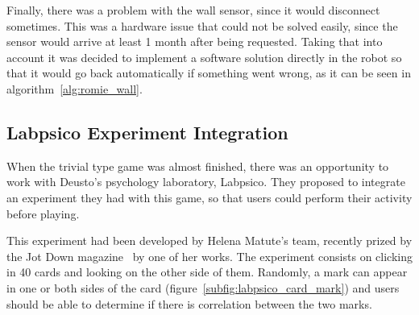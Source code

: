 Finally, there was a problem with the wall sensor, since it would disconnect sometimes. This was a
hardware issue that could not be solved easily, since the sensor would arrive at least 1 month after
being requested. Taking that into account it was decided to implement a software solution directly
in the robot so that it would go back automatically if something went wrong, as it can be seen in
algorithm~\ref{alg:romie_wall}.

\subsection{Labpsico Experiment Integration}

When the trivial type game was almost finished, there was an opportunity to work with Deusto's
psychology laboratory, Labpsico. They proposed to integrate an experiment they had with this game,
so that users could perform their activity before playing.

This experiment had been developed by Helena Matute's team, recently prized by the Jot Down
magazine~\cite{jotdown_helena} by one of her works. The experiment consists on clicking in 40 cards
and looking on the other side of them. Randomly, a mark can appear in one or both sides of the card
(figure~\ref{subfig:labpsico_card_mark}) and users should be able to determine if there is
correlation between the two marks.

